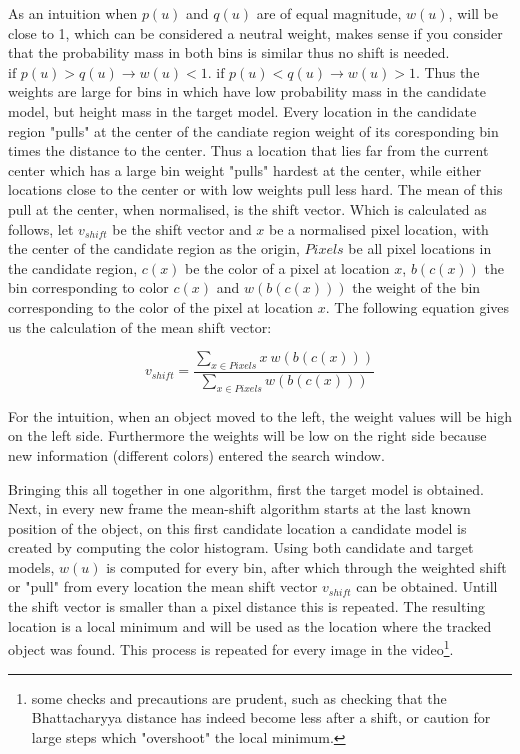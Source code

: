\documentclass[a4paper,11pt]{article}
\begin{document}
As an intuition when $p(u)$ and $q(u)$ are of equal magnitude, $w(u)$, will be close to 1, which can be considered a neutral weight, makes sense if you consider that the probability mass in both bins is similar thus no shift is needed. $\textrm{if }p(u) > q(u) \rightarrow w(u) < 1$.  $\textrm{if }p(u) < q(u) \rightarrow w(u) > 1$. Thus the weights are large for bins in  which have low probability mass in the candidate model, but height mass in the target model. Every location in the candidate region "pulls" at the center of the candiate region  weight of its coresponding bin times the distance to the center. Thus a location that lies far from the current center which has a large bin weight "pulls" hardest at the center, while either locations close to the center or with low weights pull less hard. The mean of this pull at the center, when normalised, is the shift vector. Which is calculated as follows, let $v_{shift}$ be the shift vector and $x$ be a normalised pixel location, with the center of the candidate region as the origin, $Pixels$ be all pixel locations in the candidate region, $c(x)$ be the color of a pixel at location $x$, $b(c(x))$ the bin corresponding to color $c(x)$ and $w(b(c(x)))$ the weight of the bin corresponding to the color of the pixel at location $x$. The following equation gives us the calculation of the mean shift vector:



\begin{equation}

\label{eq:shift vector}

v_{shift}=\frac{\sum_{x\in Pixels} x \ w(b(c(x)))}{\sum_{x\in Pixels} w(b(c(x)))}

\end{equation} %

    

For the intuition, when an object moved to the left, the weight values will be high on the left side. Furthermore the weights will be low on the right side because new information (different colors) entered the search window. 

 

Bringing this all together in one algorithm, first the target model is obtained. Next, in every new frame the mean-shift algorithm starts at the last known position of the object, on this first candidate location a candidate model is created by computing the color histogram. Using both candidate and target models, $w(u)$ is computed for every bin, after which through the weighted shift or "pull" from every location the mean shift vector $v_{shift}$ can be obtained. Untill the shift vector is smaller than a pixel distance this is repeated. The resulting location is a local minimum and will be used as the location where the tracked object was found. This process is repeated for every image in the video\footnote{some checks and precautions are prudent, such as checking that the Bhattacharyya distance has indeed become less after a shift, or caution for large steps which "overshoot" the local minimum. }.
\end{document}
